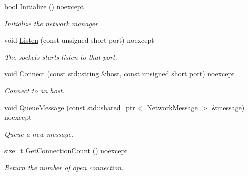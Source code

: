 \begin{DoxyCompactItemize}
\item 
\mbox{\label{class_blade_1_1_network_manager_a9b1c863473df3dddfd4347c4fa570a80}} 
bool \hyperlink{class_blade_1_1_network_manager_a9b1c863473df3dddfd4347c4fa570a80}{Initialize} () noexcept
\begin{DoxyCompactList}\small\item\em Initialize the network manager. \end{DoxyCompactList}\item 
void \hyperlink{class_blade_1_1_network_manager_a1e097a251026499832bd7238adb48d8a}{Listen} (const unsigned short port) noexcept
\begin{DoxyCompactList}\small\item\em The sockets starts listen to that port. \end{DoxyCompactList}\item 
void \hyperlink{class_blade_1_1_network_manager_a61a872d6eec9050280dc041a7cda3759}{Connect} (const std\+::string \&host, const unsigned short port) noexcept
\begin{DoxyCompactList}\small\item\em Connect to an host. \end{DoxyCompactList}\item 
\mbox{\label{class_blade_1_1_network_manager_a3127ee70f644dedfa8be9372805f6d5a}} 
void \hyperlink{class_blade_1_1_network_manager_a3127ee70f644dedfa8be9372805f6d5a}{Queue\+Message} (const std\+::shared\+\_\+ptr$<$ \hyperlink{class_blade_1_1_network_message}{Network\+Message} $>$ \&message) noexcept
\begin{DoxyCompactList}\small\item\em Queue a new message. \end{DoxyCompactList}\item 
\mbox{\label{class_blade_1_1_network_manager_ac8dcbba66d285f6a14ad1bcfa346ae5e}} 
size\+\_\+t \hyperlink{class_blade_1_1_network_manager_ac8dcbba66d285f6a14ad1bcfa346ae5e}{Get\+Connection\+Count} () noexcept
\begin{DoxyCompactList}\small\item\em Return the number of open connection. \end{DoxyCompactList}\item 

\end{DoxyCompactItemize}
